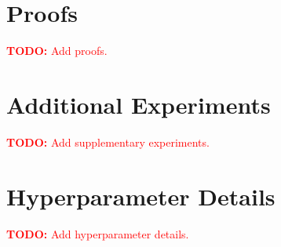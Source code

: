 \documentclass{article}
\theoremstyle{definition}
\theoremstyle{remark}
\newcommand{\todo}[1]{\textcolor{red}{\textbf{TODO:} #1}}
\begin{document}



\newpage
\appendix

\section{Proofs}
\label{app:proofs}


\todo{Add proofs.}

\section{Additional Experiments}
\label{app:additional_experiments}


\todo{Add supplementary experiments.}

\section{Hyperparameter Details}
\label{app:hyperparameters}


\todo{Add hyperparameter details.}
\end{document}
